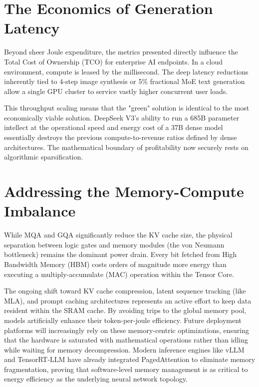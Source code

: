 \documentclass[12pt, a4paper]{report}
\begin{document}
\section{The Economics of Generation Latency}
Beyond sheer Joule expenditure, the metrics presented directly influence the Total Cost of Ownership (TCO) for enterprise AI endpoints. In a cloud environment, compute is leased by the millisecond. The deep latency reductions inherently tied to 4-step image synthesis or 5\% fractional MoE text generation allow a single GPU cluster to service vastly higher concurrent user loads. 

This throughput scaling means that the "green" solution is identical to the most economically viable solution. DeepSeek V3's ability to run a 685B parameter intellect at the operational speed and energy cost of a 37B dense model essentially destroys the previous compute-to-revenue ratios defined by dense architectures. The mathematical boundary of profitability now securely rests on algorithmic sparsification.

\section{Addressing the Memory-Compute Imbalance}
While MQA and GQA significantly reduce the KV cache size, the physical separation between logic gates and memory modules (the von Neumann bottleneck) remains the dominant power drain. Every bit fetched from High Bandwidth Memory (HBM) costs orders of magnitude more energy than executing a multiply-accumulate (MAC) operation within the Tensor Core. 

The ongoing shift toward KV cache compression, latent sequence tracking (like MLA), and prompt caching architectures represents an active effort to keep data resident within the SRAM cache. By avoiding trips to the global memory pool, models artificially enhance their token-per-joule efficiency. Future deployment platforms will increasingly rely on these memory-centric optimizations, ensuring that the hardware is saturated with mathematical operations rather than idling while waiting for memory decompression. Modern inference engines like vLLM and TensorRT-LLM have already integrated PagedAttention to eliminate memory fragmentation, proving that software-level memory management is as critical to energy efficiency as the underlying neural network topology.


\end{document}
